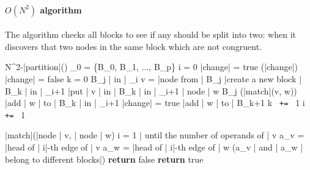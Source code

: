 \documentclass[a4paper,12pt, notitlepage]{article}
\newcommand{\negv}{\vspace{-0.7cm}}
\begin{document}
\paragraph*{$O(N^2)$ algorithm}
The algorithm checks all blocks to see if any should be split into two:
when it discovers that two nodes in the same block which are not congruent.

\begin{program}
\PROC N^2-|partition|() \BODY
    \pi_0 = \{B_0, B_1, ..., B_p\}
    i = 0
    |change| = true
    \WHILE (|change|) \DO
        |change| = false
        k = 0
        \FOREACH B_j | in | \pi_i \DO
            v = |node from | B_j
            |create a new block | B_k | in | \pi_{i+1}
            |put | v | in | B_k | in | \pi_{i+1}
            \FOREACH | node | w \in B_j \DO
                \IF (|match|(v, w)) \AR*
                    |add | w | to | B_k | in | \pi_{i+1}
                \ELSE
                    |change| = true
                    |add | w | to | B_{k+1}
                \FI
            \OD
        k \texttt{ += } 1
    \OD
    i \texttt{ += } 1
\end{program}
\negv
\begin{program}
\FUNCT |match|(|node | v, | node | w) \BODY
    \FOR i = 1 | until the number of operands of | v \DO
        a_v = |head of | i|-th edge of | v
        a_w = |head of | i|-th edge of | w
        \IF (a_v | and | a_w | belong to different blocks|) \AR*
            \textbf{return } false
        \FI
    \OD
    \textbf{return } true
\end{program}
\end{document}
